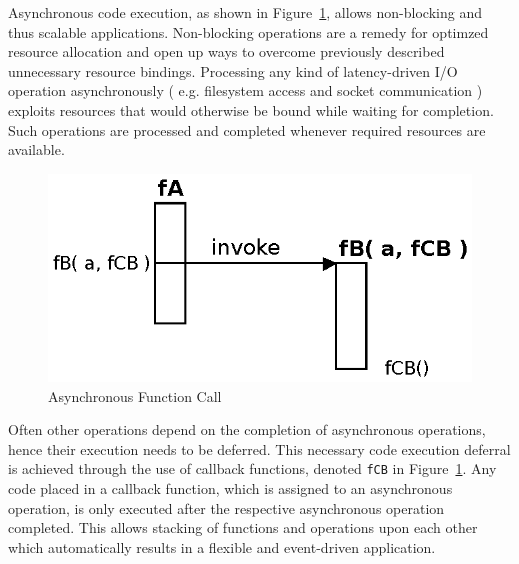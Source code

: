 Asynchronous code execution, as shown in Figure~\ref{fig:Closures_Asynchronous}, allows non-blocking and thus scalable applications.
Non-blocking operations are a remedy for optimzed resource allocation and open up ways to overcome previously described unnecessary resource bindings.
Processing any kind of latency-driven I/O operation asynchronously ( e.g. filesystem access and socket communication ) exploits resources that would otherwise be bound while waiting for completion.
Such operations are processed and completed whenever required resources are available.
\begin{figure}[h!]
	\centering
  \includegraphics{figures/Closures_Asynchronous}
	\caption{Asynchronous Function Call}
	\label{fig:Closures_Asynchronous}
\end{figure}


Often other operations depend on the completion of asynchronous operations, hence their execution needs to be deferred.
This necessary code execution deferral is achieved through the use of callback functions, denoted \texttt{fCB} in Figure~\ref{fig:Closures_Asynchronous}.
Any code placed in a callback function, which is assigned to an asynchronous operation, is only executed after the respective asynchronous operation completed.
This allows stacking of functions and operations upon each other which automatically results in a flexible and event-driven application.


